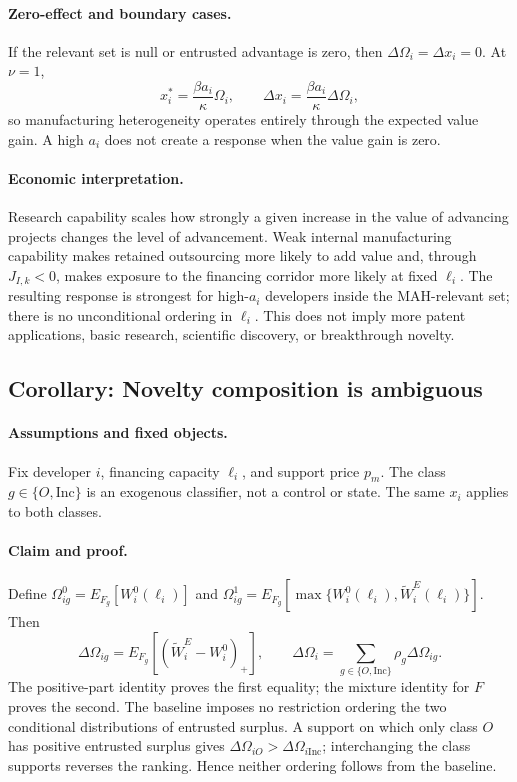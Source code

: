 \paragraph{Zero-effect and boundary cases.}
If the relevant set is null or entrusted advantage is zero, then
\(\Delta\Omega_i=\Delta x_i=0\). At \(\nu=1\),
\[
  x_i^*=\frac{\beta a_i}{\kappa}\Omega_i,
  \qquad
  \Delta x_i=\frac{\beta a_i}{\kappa}\Delta\Omega_i,
\]
so manufacturing heterogeneity operates entirely through the expected value
gain. A high \(a_i\) does not create a response when the value gain is zero.

\paragraph{Economic interpretation.}
Research capability scales how strongly a given increase in the value of
advancing projects changes the level of advancement. Weak internal
manufacturing capability makes retained outsourcing more likely to add value
and, through \(J_{I,k}<0\), makes exposure to the financing corridor more
likely at fixed \(\ell_i\). The resulting response is strongest for
high-\(a_i\) developers inside the MAH-relevant set; there is no unconditional
ordering in \(\ell_i\). This
does not imply more patent applications, basic research, scientific
discovery, or breakthrough novelty.

\subsection{Corollary: Novelty composition is ambiguous}
\label{cor:p08-novelty}

\paragraph{Assumptions and fixed objects.}
Fix developer \(i\), financing capacity \(\ell_i\), and support price \(p_m\). The class
\(g\in\{O,\mathrm{Inc}\}\) is an exogenous classifier, not a control or state.
The same \(x_i\) applies to both classes.

\paragraph{Claim and proof.}
Define
\(\Omega_{ig}^0=E_{F_g}[W_i^0(\ell_i)]\) and
\(\Omega_{ig}^1=E_{F_g}[\max\{W_i^0(\ell_i),\widetilde W_i^E(\ell_i)\}]\). Then
\begin{equation}
  \Delta\Omega_{ig}
  =
  E_{F_g}
  \left[
    \left(\widetilde W_i^E-W_i^0\right)_+
  \right],
  \qquad
  \Delta\Omega_i
  =
  \sum_{g\in\{O,\mathrm{Inc}\}}\rho_g\Delta\Omega_{ig}.
  \label{eq:p08-class-gain}
\end{equation}
The positive-part identity proves the first equality; the mixture identity
for \(F\) proves the second. The baseline imposes no restriction ordering the
two conditional distributions of entrusted surplus. A support on which only
class \(O\) has positive entrusted surplus gives
\(\Delta\Omega_{iO}>\Delta\Omega_{i\mathrm{Inc}}\); interchanging the class
supports reverses the ranking. Hence neither ordering follows from the
baseline.


